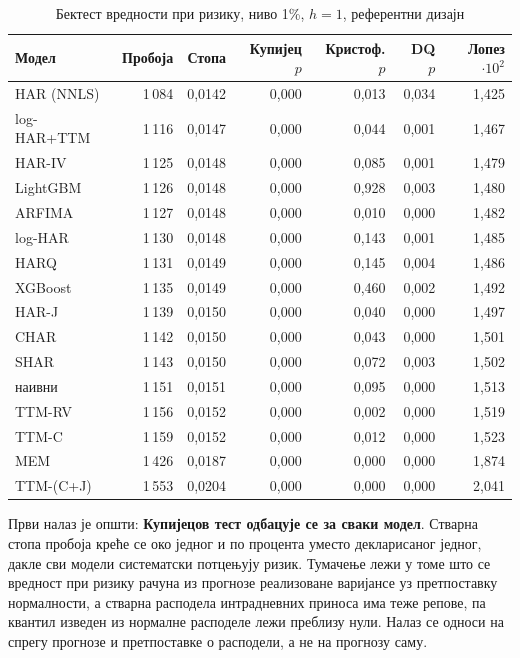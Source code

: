 \begin{table}[htbp]
\centering
\caption{Бектест вредности при ризику, ниво 1\%, $h = 1$, референтни дизајн}
\label{tab:var}
\small
\begin{tabular}{lrrrrrr}
\toprule
Модел & Пробоја & Стопа & Купијец $p$ & Кристоф. $p$ & DQ $p$ & Лопез$\cdot10^{2}$ \\
\midrule
HAR (NNLS)   & 1\,084 & 0,0142 & 0,000 & 0,013 & 0,034 & 1,425 \\
log-HAR+TTM & 1\,116 & 0,0147 & 0,000 & 0,044 & 0,001 & 1,467 \\
HAR-IV      & 1\,125 & 0,0148 & 0,000 & 0,085 & 0,001 & 1,479 \\
LightGBM    & 1\,126 & 0,0148 & 0,000 & 0,928 & 0,003 & 1,480 \\
ARFIMA      & 1\,127 & 0,0148 & 0,000 & 0,010 & 0,000 & 1,482 \\
log-HAR     & 1\,130 & 0,0148 & 0,000 & 0,143 & 0,001 & 1,485 \\
HARQ        & 1\,131 & 0,0149 & 0,000 & 0,145 & 0,004 & 1,486 \\
XGBoost     & 1\,135 & 0,0149 & 0,000 & 0,460 & 0,002 & 1,492 \\
HAR-J       & 1\,139 & 0,0150 & 0,000 & 0,040 & 0,000 & 1,497 \\
CHAR        & 1\,142 & 0,0150 & 0,000 & 0,043 & 0,000 & 1,501 \\
SHAR        & 1\,143 & 0,0150 & 0,000 & 0,072 & 0,003 & 1,502 \\
наивни      & 1\,151 & 0,0151 & 0,000 & 0,095 & 0,000 & 1,513 \\
TTM-RV      & 1\,156 & 0,0152 & 0,000 & 0,002 & 0,000 & 1,519 \\
TTM-C       & 1\,159 & 0,0152 & 0,000 & 0,012 & 0,000 & 1,523 \\
MEM         & 1\,426 & 0,0187 & 0,000 & 0,000 & 0,000 & 1,874 \\
TTM-(C+J)   & 1\,553 & 0,0204 & 0,000 & 0,000 & 0,000 & 2,041 \\
\bottomrule
\end{tabular}
\end{table}

Први налаз је општи: \textbf{Купијецов тест одбацује се за сваки модел}. Стварна стопа
пробоја креће се око једног и по процента уместо декларисаног једног, дакле сви модели
систематски потцењују ризик. Тумачење лежи у томе што се вредност при ризику рачуна из
прогнозе реализоване варијансе уз претпоставку нормалности, а стварна расподела
интрадневних приноса има теже репове, па квантил изведен из нормалне расподеле лежи
преблизу нули. Налаз се односи на спрегу прогнозе и претпоставке о расподели, а не на
прогнозу саму.

